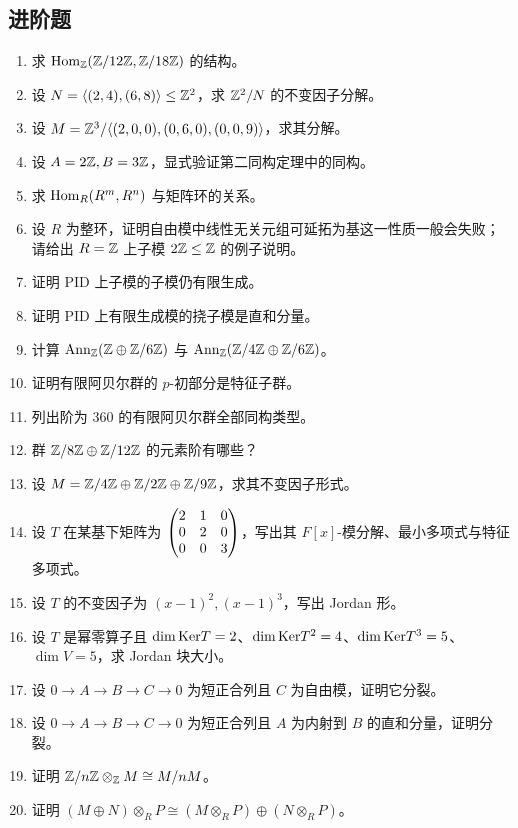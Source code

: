 \subsection*{进阶题}
\begin{enumerate}[resume, label=\textbf{\arabic*.}, leftmargin=*, itemsep=0.5em]
\item \medium 求 $\mathrm{Hom}_{\mathbb{Z}}(\mathbb{Z}/12\mathbb{Z},\mathbb{Z}/18\mathbb{Z})$ 的结构。
\item \medium 设 $N=\langle (2,4),(6,8)\rangle\le \mathbb{Z}^2$，求 $\mathbb{Z}^2/N$ 的不变因子分解。
\item \medium 设 $M=\mathbb{Z}^3/\langle (2,0,0),(0,6,0),(0,0,9)\rangle$，求其分解。
\item \medium 设 $A=2\mathbb{Z},B=3\mathbb{Z}$，显式验证第二同构定理中的同构。
\item \medium 求 $\mathrm{Hom}_R(R^m,R^n)$ 与矩阵环的关系。
\item \medium 设 $R$ 为整环，证明自由模中线性无关元组可延拓为基这一性质一般会失败；请给出 $R=\mathbb{Z}$ 上子模 $2\mathbb{Z}\le \mathbb{Z}$ 的例子说明。
\item \medium 证明 PID 上子模的子模仍有限生成。
\item \medium 证明 PID 上有限生成模的挠子模是直和分量。
\item \medium 计算 $\mathrm{Ann}_{\mathbb{Z}}(\mathbb{Z}\oplus \mathbb{Z}/6\mathbb{Z})$ 与 $\mathrm{Ann}_{\mathbb{Z}}(\mathbb{Z}/4\mathbb{Z}\oplus \mathbb{Z}/6\mathbb{Z})$。
\item \medium 证明有限阿贝尔群的 $p$-初部分是特征子群。
\item \medium 列出阶为 $360$ 的有限阿贝尔群全部同构类型。
\item \medium 群 $\mathbb{Z}/8\mathbb{Z}\oplus \mathbb{Z}/12\mathbb{Z}$ 的元素阶有哪些？
\item \medium 设 $M=\mathbb{Z}/4\mathbb{Z}\oplus \mathbb{Z}/2\mathbb{Z}\oplus \mathbb{Z}/9\mathbb{Z}$，求其不变因子形式。
\item \medium 设 $T$ 在某基下矩阵为 $\begin{pmatrix} 2&1&0\\0&2&0\\0&0&3 \end{pmatrix}$，写出其 $F[x]$-模分解、最小多项式与特征多项式。
\item \medium 设 $T$ 的不变因子为 $(x-1)^2,(x-1)^3$，写出 Jordan 形。
\item \medium 设 $T$ 是幂零算子且 $\dim \mathrm{Ker} T=2$、$\dim \mathrm{Ker} T^2=4$、$\dim \mathrm{Ker} T^3=5$、$\dim V=5$，求 Jordan 块大小。
\item \medium 设 $0\to A\to B\to C\to 0$ 为短正合列且 $C$ 为自由模，证明它分裂。
\item \medium 设 $0\to A\to B\to C\to 0$ 为短正合列且 $A$ 为内射到 $B$ 的直和分量，证明分裂。
\item \medium 证明 $\mathbb{Z}/n\mathbb{Z}\otimes_{\mathbb{Z}} M\cong M/nM$。
\item \medium 证明 $(M\oplus N)\otimes_R P\cong (M\otimes_R P)\oplus (N\otimes_R P)$。

\end{enumerate}
